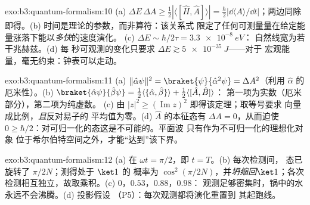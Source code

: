 \begin{solution}{exo:b3:quantum-formalism:10}
(a) $\Delta E\,\Delta A \ge \tfrac12|\langle[\hat H, \hat
A]\rangle| = \tfrac\hbar2|\dd\langle A\rangle/\dd t|$；两边同除即得。(b)
时间是理论的参数，而非算符：该关系式
限定了任何可测量量在给定能量涨落下能以\emph{多快}的速度演化。
(c) $\Delta E \sim \hbar/2\tau = \qty{3.3e-8}{eV}$：
自然线宽为若干兆赫兹。(d) 每
秒可观测的变化只要求 $\Delta E \gtrsim \qty{5e-35}{J}$——对于
宏观能量，毫无约束：钟表可以走动。
\end{solution}

\begin{solution}{exo:b3:quantum-formalism:11}
(a) $\|\hat\alpha\psi\|^2 = \braket{\psi}{\hat\alpha^2\psi} =
\Delta A^2$（利用 $\hat\alpha$ 的厄米性）。(b) $\braket{\hat\alpha
\psi}{\hat\beta\psi} = \tfrac12\langle\{\hat\alpha,
\hat\beta\}\rangle + \tfrac12\langle[\hat A, \hat B]\rangle$：
第一项为实数（厄米部分），第二项为纯虚数。
(c) 由 $|z|^2 \ge (\operatorname{Im}z)^2$ 即得该定理；取等号要求
向量成比例，\emph{且}反对易子的
平均值为零。(d) $\hat A$ 的本征态有 $\Delta A = 0$，从而迫使
$0 \ge \hbar/2$：对可归一化的态这是不可能的。平面波
只有作为不可归一化的理想化对象
位于希尔伯特空间之外，才能“达到”该下界。
\end{solution}

\begin{solution}{exo:b3:quantum-formalism:12}
(a) 在 $\omega t = \pi/2$，即 $t = T$。(b) 每次检测间，
态已旋转了 $\pi/2N$；测得处于 $\ket1$ 的
概率为 $\cos^2(\pi/2N)$，并\emph{坍缩回}$\ket1$；各次
检测相互独立，故取乘积。(c) $0$，$0.53$，$0.88$，$0.98$：
观测足够密集时，锅中的水永远不会沸腾。(d) 投影假设
（P5）：每次观测都将演化重置到
其起跑线。
\end{solution}

